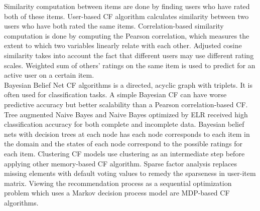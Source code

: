 \documentclass[10pt]{article}
\begin{document}
Similarity computation between items are done by finding users who have rated both of these items. User-based CF algorithm calculates similarity between two users who have both rated the same items. Correlation-based similarity computation is done by computing the Pearson correlation, which measures the extent to which two variables linearly relate with each other. Adjusted cosine similarity takes into account the fact that different users may use different rating scales. Weighted sum of others' ratings on the same item is used to predict for an active user on a certain item. \\

Bayesian Belief Net CF algorithms is a directed, acyclic graph with triplets. It is often used for classification tasks. A simple Bayesian CF can have worse predictive accuracy but better scalability than a Pearson correlation-based CF. Tree augmented Naive Bayes and Naive Bayes optimized by ELR received high classification accuracy for both complete and incomplete data. Bayesian belief nets with decision trees at each node has each node corresponds to each item in the domain and the states of each node correspond to the possible ratings for each item. Clustering CF models use clustering as an intermediate step before applying other memory-based CF algorithm. Sparse factor analysis replaces missing elements with default voting values to remedy the sparseness in user-item matrix. Viewing the recommendation process as a sequential optimization problem which uses a Markov decision process model are MDP-based CF algorithms. \\




\end{document}
